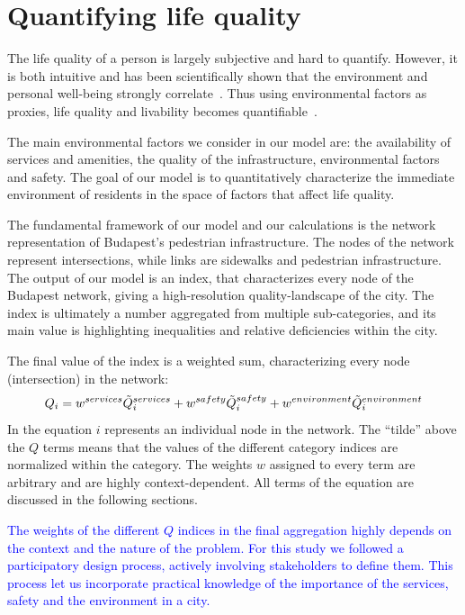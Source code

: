 \section{Quantifying life quality}
The life quality of a person is largely subjective and hard to quantify. However, it is both intuitive and has been scientifically shown that the environment and personal well-being strongly correlate~\cite{Rosow1961Social}. Thus using environmental factors as proxies, life quality and livability becomes quantifiable~\cite{Kahneman2006Developments}.

The main environmental factors we consider in our model are: the availability of services and amenities, the quality of the infrastructure, environmental factors and safety. The goal of our model is to quantitatively characterize the immediate environment of residents in the space of factors that affect life quality.

The fundamental framework of our model and our calculations is the network representation of Budapest’s pedestrian infrastructure. The nodes of the network represent intersections, while links are sidewalks and pedestrian infrastructure. The output of our model is an index, that characterizes every node of the Budapest network, giving a high-resolution quality-landscape of the city. The index is ultimately a number aggregated from multiple sub-categories, and its main value is highlighting inequalities and relative deficiencies within the city.

The final value of the index is a weighted sum, characterizing every node (intersection) in the network:
\begin{equation} \label{final_Q}
	Q_i =w^{services}\Tilde{Q}_i^{services} + w^{safety} \Tilde{Q}_i^{safety} + w^{environment}\Tilde{Q}_i^{environment}
\end{equation}
In the equation $i$ represents an individual node in the network. The ``tilde'' above the $Q$ terms means that the values of the different category indices are normalized within the category. The weights $w$ assigned to every term are arbitrary and are highly context-dependent. All terms of the equation are discussed in the following sections.

\textcolor{blue}{The weights of the different $Q$ indices in the final aggregation highly depends on the context and the nature of the problem. For this study we followed a participatory design process, actively involving stakeholders to define them. This process let us incorporate practical knowledge of the importance of the services, safety and the environment in a city.}

